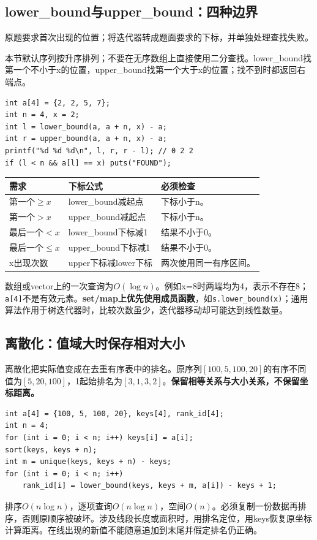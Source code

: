 \subsection{lower\_bound与upper\_bound：四种边界}
原题要求首次出现的位置；将迭代器转成题面要求的下标，并单独处理查找失败。

本节默认序列按升序排列；不要在无序数组上直接使用二分查找。lower\_bound找第一个不小于x的位置，upper\_bound找第一个大于x的位置；找不到时都返回右端点。
\begin{lstlisting}
int a[4] = {2, 2, 5, 7};
int n = 4, x = 2;
int l = lower_bound(a, a + n, x) - a;
int r = upper_bound(a, a + n, x) - a;
printf("%d %d %d\n", l, r, r - l); // 0 2 2
if (l < n && a[l] == x) puts("FOUND");
\end{lstlisting}
\begin{longtable}{P{4.5cm}P{5cm}P{4.7cm}}
\toprule 需求 & 下标公式 & 必须检查\\\midrule\endhead
第一个$\ge x$ & lower\_bound减起点 & 下标小于n。\\
第一个$>x$ & upper\_bound减起点 & 下标小于n。\\
最后一个$<x$ & lower\_bound下标减1 & 结果不小于0。\\
最后一个$\le x$ & upper\_bound下标减1 & 结果不小于0。\\
x出现次数 & upper下标减lower下标 & 两次使用同一有序区间。\\
\bottomrule
\end{longtable}
数组或vector上的一次查询为$O(\log n)$。例如x=8时两端均为4，表示不存在8；\texttt{a[4]}不是有效元素。\textbf{set/map上优先使用成员函数}，如\texttt{s.lower\_bound(x)}；通用算法作用于树迭代器时，比较次数虽少，迭代器移动却可能达到线性数量。

\subsection{离散化：值域大时保存相对大小}
离散化把实际值变成在去重有序表中的排名。原序列$[100,5,100,20]$的有序不同值为$[5,20,100]$，1起始排名为$[3,1,3,2]$。\textbf{保留相等关系与大小关系，不保留坐标距离。}
\begin{lstlisting}
int a[4] = {100, 5, 100, 20}, keys[4], rank_id[4];
int n = 4;
for (int i = 0; i < n; i++) keys[i] = a[i];
sort(keys, keys + n);
int m = unique(keys, keys + n) - keys;
for (int i = 0; i < n; i++)
    rank_id[i] = lower_bound(keys, keys + m, a[i]) - keys + 1;
\end{lstlisting}
排序$O(n\log n)$，逐项查询$O(n\log n)$，空间$O(n)$。必须复制一份数据再排序，否则原顺序被破坏。涉及线段长度或面积时，用排名定位，用keys恢复原坐标计算距离。在线出现的新值不能随意追加到末尾并假定排名仍正确。

